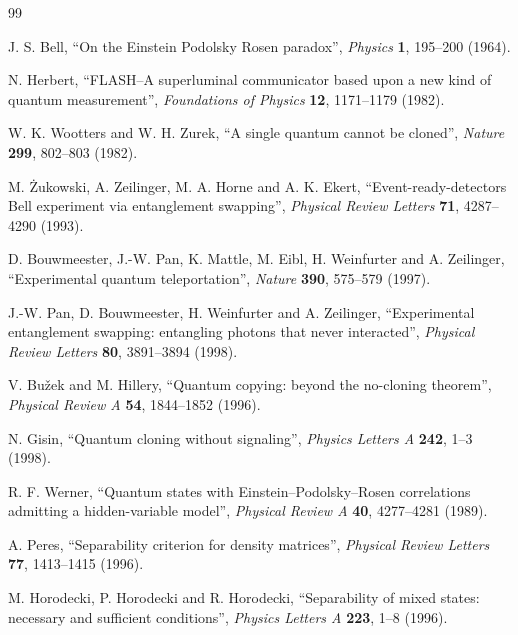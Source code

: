 \begin{thebibliography}{99}

J. S. Bell, ``On the Einstein Podolsky Rosen paradox'', \emph{Physics} \textbf{1}, 195--200 (1964).

N. Herbert, ``FLASH--A superluminal communicator based upon a new kind of quantum measurement'', \emph{Foundations of Physics} \textbf{12}, 1171--1179 (1982).

W. K. Wootters and W. H. Zurek, ``A single quantum cannot be cloned'', \emph{Nature} \textbf{299}, 802--803 (1982).

M. {\.Z}ukowski, A. Zeilinger, M. A. Horne and A. K. Ekert, ``Event-ready-detectors Bell experiment via entanglement swapping'', \emph{Physical Review Letters} \textbf{71}, 4287--4290 (1993).

D. Bouwmeester, J.-W. Pan, K. Mattle, M. Eibl, H. Weinfurter and A. Zeilinger, ``Experimental quantum teleportation'', \emph{Nature} \textbf{390}, 575--579 (1997).

J.-W. Pan, D. Bouwmeester, H. Weinfurter and A. Zeilinger, ``Experimental entanglement swapping: entangling photons that never interacted'', \emph{Physical Review Letters} \textbf{80}, 3891--3894 (1998).

V. Bu{\v z}ek and M. Hillery, ``Quantum copying: beyond the no-cloning theorem'', \emph{Physical Review A} \textbf{54}, 1844--1852 (1996).

N. Gisin, ``Quantum cloning without signaling'', \emph{Physics Letters A} \textbf{242}, 1--3 (1998).


R. F. Werner, ``Quantum states with Einstein--Podolsky--Rosen correlations admitting a hidden-variable model'', \emph{Physical Review A} \textbf{40}, 4277--4281 (1989).

A. Peres, ``Separability criterion for density matrices'', \emph{Physical Review Letters} \textbf{77}, 1413--1415 (1996).

M. Horodecki, P. Horodecki and R. Horodecki, ``Separability of mixed states: necessary and sufficient conditions'', \emph{Physics Letters A} \textbf{223}, 1--8 (1996).

\end{thebibliography}
